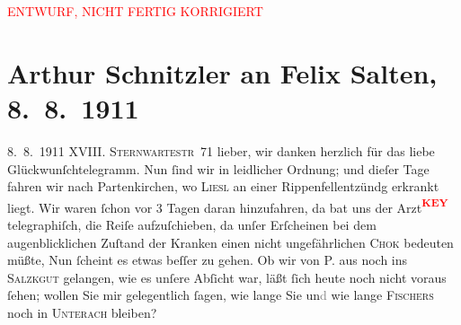 
\begin{center}
            \textcolor{red}{ENTWURF, NICHT FERTIG KORRIGIERT}
                      \end{center}
            
         
         \renewcommand{\erwaehntePersonen}{Personen: Samuel Fischer, Hedwig Fischer, Felix Salten, Elisabeth Steinrück}
         \renewcommand{\erwaehnteOrte}{Orte: Partenkirchen, Salzkammergut, Sternwartestraße, Unterach am Attersee, Wien}
         \renewcommand{\erwaehnteWerke}{}
               \section[Arthur Schnitzler an Felix Salten, 8. 8. 1911]{ Arthur Schnitzler an Felix Salten, 8. 8. 1911}\nopagebreak{}\rehead{ }\begin{ledgroupsized}[t]{13cm}\normalsize\beginnumbering \toendnotes[C]{\smallbreak\pagebreak[2]} 
\toendnotes[C]{\smallbreak}\pstart
           \raggedleft{}{\pb}8. 8. 1911\pend
           \pstart
           \raggedleft{}\textsc{XVIII. Sternwartestr 71}\pend
           \pstart
           lieber, wir danken herzlich für das liebe Glückwunſchtelegramm. Nun ſind wir in
               leidlicher Ordnung; und dieſer Tage fahren wir nach Partenkirchen, wo \textsc{Liesl} an einer Rippenfellentzündg erkrankt liegt. Wir waren ſchon vor 3 Tagen daran
               hinzufahren, {\pb} da bat uns der Arzt\textcolor{red}{\textsuperscript{\textbf{KEY}}} telegraphiſch, die Reiſe aufzuſchieben, da unſer Erſcheinen bei dem
               augenblicklichen Zuſtand der Kranken einen nicht ungefährlichen \textsc{Chok} bedeuten müßte, Nun ſcheint es etwas beſſer zu gehen. Ob wir von P. aus noch ins \textsc{Salzkgut} gelangen, wie es unſere Abſicht war, läßt ſich heute noch nicht voraus {\pb} ſehen; wollen Sie mir gelegentlich ſagen, wie lange Sie
                  un\textcolor{gray}{d} wie lange \textsc{Fischers} noch in \textsc{Unterach} bleiben? \pend

\end{ledgroupsized}
